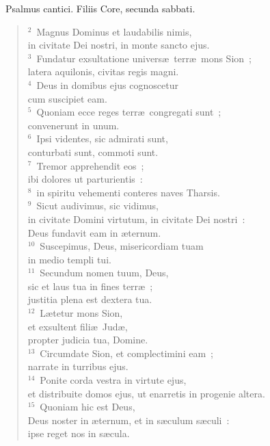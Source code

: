 ~\lettrine[lines=10,image=true,loversize=0.05,lraise=-0.03]{P}{}salmus cantici. Filiis Core, secunda sabbati.
\begin{flushleft}\begin{verse}\vspace{6pt}${}^{2}$~Magnus Dominus et laudabilis nimis,\\ in civitate Dei nostri, in monte sancto ejus.\\
${}^{3}$~Fundatur exsultatione univers\ae\ terr\ae\ mons Sion~;\\ latera aquilonis, civitas regis magni.\\
${}^{4}$~Deus in domibus ejus cognoscetur\\ cum suscipiet eam.\\
${}^{5}$~Quoniam ecce reges terr\ae\ congregati sunt~;\\ convenerunt in unum.\\
${}^{6}$~Ipsi videntes, sic admirati sunt,\\ conturbati sunt, commoti sunt.\\
${}^{7}$~Tremor apprehendit eos~;\\ ibi dolores ut parturientis~:\\
${}^{8}$~in spiritu vehementi conteres naves Tharsis.\\
${}^{9}$~Sicut audivimus, sic vidimus,\\ in civitate Domini virtutum, in civitate Dei nostri~:\\ Deus fundavit eam in \ae ternum.\\
${}^{10}$~Suscepimus, Deus, misericordiam tuam\\ in medio templi tui.\\
${}^{11}$~Secundum nomen tuum, Deus,\\ sic et laus tua in fines terr\ae~;\\ justitia plena est dextera tua.\\
${}^{12}$~L\ae tetur mons Sion,\\ et exsultent fili\ae\ Jud\ae ,\\ propter judicia tua, Domine.\\
${}^{13}$~Circumdate Sion, et complectimini eam~;\\ narrate in turribus ejus.\\
${}^{14}$~Ponite corda vestra in virtute ejus,\\ et distribuite domos ejus, ut enarretis in progenie altera.\\
${}^{15}$~Quoniam hic est Deus,\\ Deus noster in \ae ternum, et in s\ae culum s\ae culi~:\\ ipse reget nos in s\ae cula.\end{verse}\end{flushleft}


